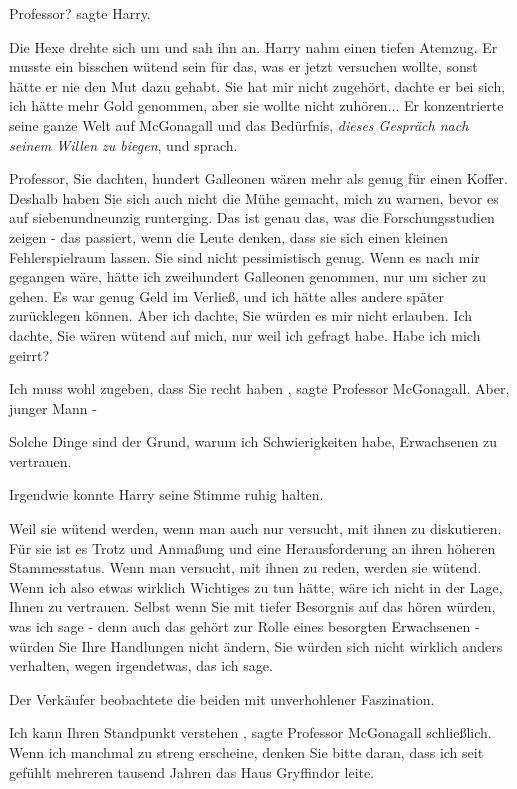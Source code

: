 \glqq Professor?\grqq{} sagte Harry.

Die Hexe drehte sich um und sah ihn an. Harry nahm einen tiefen Atemzug. Er
musste ein bisschen wütend sein für das, was er jetzt versuchen wollte,
sonst hätte er nie den Mut dazu gehabt. Sie hat mir nicht zugehört, dachte
er bei sich, ich hätte mehr Gold genommen, aber sie wollte nicht zuhören...
Er konzentrierte seine ganze Welt auf McGonagall und das Bedürfnis,
\emph{dieses Gespräch nach seinem Willen zu biegen}, und sprach.

\glqq Professor, Sie dachten, hundert Galleonen wären mehr als genug für einen
Koffer. Deshalb haben Sie sich auch nicht die Mühe gemacht, mich zu warnen,
bevor es auf siebenundneunzig runterging. Das ist genau das, was die
Forschungsstudien zeigen - das passiert, wenn die Leute denken, dass sie
sich einen kleinen Fehlerspielraum lassen. Sie sind nicht pessimistisch
genug. Wenn es nach mir gegangen wäre, hätte ich zweihundert Galleonen
genommen, nur um sicher zu gehen. Es war genug Geld im Verließ, und ich
hätte alles andere später zurücklegen können. Aber ich dachte, Sie würden es
mir nicht erlauben. Ich dachte, Sie wären wütend auf mich, nur weil ich
gefragt habe. Habe ich mich geirrt?\grqq{}

\glqq Ich muss wohl zugeben, dass Sie recht haben\grqq{} , sagte Professor
McGonagall. \glqq Aber, junger Mann -\grqq{}

\glqq Solche Dinge sind der Grund, warum ich Schwierigkeiten habe, Erwachsenen
zu vertrauen.\grqq{}

Irgendwie konnte Harry seine Stimme ruhig halten.

\glqq Weil sie wütend werden, wenn man auch nur versucht, mit ihnen zu
diskutieren. Für sie ist es Trotz und Anmaßung und eine Herausforderung an
ihren höheren Stammesstatus. Wenn man versucht, mit ihnen zu reden, werden
sie wütend. Wenn ich also etwas wirklich Wichtiges zu tun hätte, wäre ich
nicht in der Lage, Ihnen zu vertrauen. Selbst wenn Sie mit tiefer Besorgnis
auf das hören würden, was ich sage - denn auch das gehört zur Rolle eines
besorgten Erwachsenen - würden Sie Ihre Handlungen nicht ändern, Sie würden
sich nicht wirklich anders verhalten, wegen irgendetwas, das ich
sage.\grqq{}

Der Verkäufer beobachtete die beiden mit unverhohlener Faszination.

\glqq Ich kann Ihren Standpunkt verstehen\grqq{} , sagte Professor McGonagall
schließlich. \glqq Wenn ich manchmal zu streng erscheine, denken Sie bitte
daran, dass ich seit gefühlt mehreren tausend Jahren das Haus Gryffindor
leite.\grqq{}

